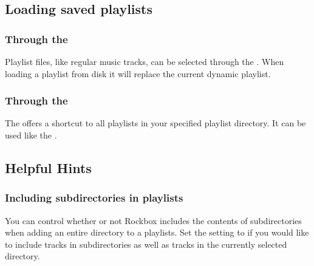 \subsection{Loading saved playlists}
\subsubsection{Through the }
Playlist files, like regular music tracks, can be selected through the 
. When loading a playlist from disk it will replace
the current dynamic playlist.

\subsubsection{Through the }
The  offers a shortcut to all playlists in your
\daps{} specified playlist directory.
It can be used like the .

\subsection{Helpful Hints}

\subsubsection{Including subdirectories in playlists}
You can control whether or not Rockbox includes the contents of
subdirectories when adding an entire directory to a playlists.
Set the 
setting to  if you would like to include tracks in subdirectories
as well as tracks in the currently selected directory.
